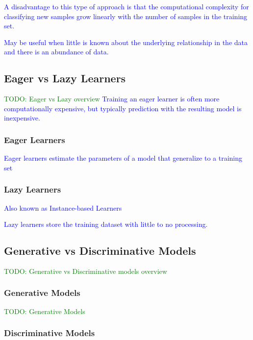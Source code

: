 \textcolor{blue}{A disadvantage to this type of approach is that the computational complexity for classifying new samples grow linearly with the number of samples in the training set.}

\textcolor{blue}{May be useful when little is known about the underlying relationship in the data and there is an abundance of data.}

\subsection{Eager vs Lazy Learners}

\textcolor{green}{TODO: Eager vs Lazy overview}
\textcolor{blue}{Training an eager learner is often more computationally expensive, but typically prediction with the resulting model is inexpensive.}

\subsubsection{Eager Learners}

\textcolor{blue}{Eager learners estimate the parameters of a model that generalize to a training set}

\subsubsection{Lazy Learners}

\textcolor{blue}{Also known as Instance-based Learners}

\textcolor{blue}{Lazy learners store the training dataset with little to no processing.}


\subsection{Generative vs Discriminative Models}

\textcolor{green}{TODO: Generative vs Discriminative models overview}

\subsubsection{Generative Models}

\textcolor{green}{TODO: Generative Models}

\subsubsection{Discriminative Models}

